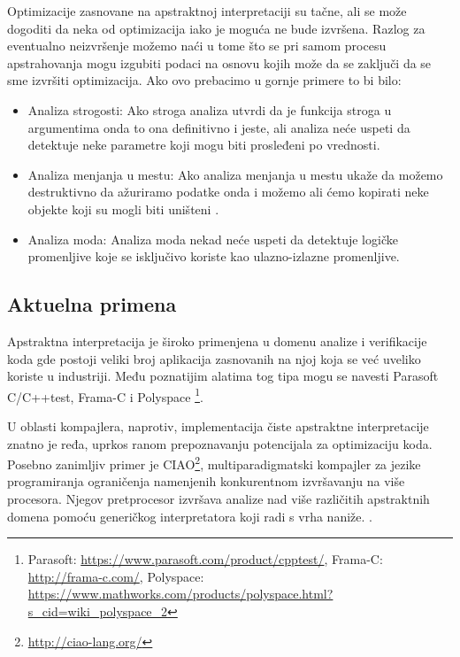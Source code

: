 Optimizacije zasnovane na apstraktnoj interpretaciji su tačne, ali se može dogoditi da neka od optimizacija iako je moguća ne bude izvršena. Razlog za eventualno neizvršenje možemo naći u tome što se pri samom procesu apstrahovanja mogu izgubiti podaci na osnovu kojih može da se zaključi da se sme izvršiti optimizacija. Ako ovo prebacimo u gornje primere to bi bilo:




\begin{itemize}
\item Analiza strogosti:
Ako stroga analiza utvrdi da je funkcija stroga u argumentima onda to ona definitivno i jeste, ali analiza neće uspeti da detektuje neke parametre koji mogu biti prosleđeni po vrednosti. 

\item Analiza menjanja u mestu:
Ako analiza menjanja u mestu ukaže da možemo destruktivno da ažuriramo podatke onda i možemo ali ćemo kopirati neke objekte koji su mogli biti uništeni \cite{Girard1987}. 


\item Analiza moda:
Analiza moda nekad neće uspeti da detektuje logičke promenljive koje se isključivo koriste kao ulazno-izlazne promenljive. 

\end{itemize}

\subsection{Aktuelna primena}
Apstraktna interpretacija je široko primenjena u domenu analize i verifikacije koda gde postoji veliki broj aplikacija zasnovanih na njoj koja se već uveliko koriste u industriji\cite{Wilhelm-Wachter}. Među poznatijim alatima tog tipa mogu se navesti Parasoft C/C++test, Frama-C i Polyspace \footnote{Parasoft: \url{https://www.parasoft.com/product/cpptest/}, Frama-C: \url{http://frama-c.com/}, Polyspace: \url{https://www.mathworks.com/products/polyspace.html?s_cid=wiki_polyspace_2}}. 

U oblasti kompajlera, naprotiv, implementacija čiste apstraktne interpretacije znatno je ređa, uprkos ranom prepoznavanju potencijala za optimizaciju koda\cite{cousot}. 	Posebno zanimljiv primer je CIAO\footnote{\url{http://ciao-lang.org/}}, multiparadigmatski kompajler za jezike programiranja ograničenja namenjenih konkurentnom izvršavanju na više procesora. Njegov pretprocesor izvršava analize nad više različitih apstraktnih domena pomoću generičkog interpretatora koji radi 	s vrha naniže. \cite{ciao-report}. 

